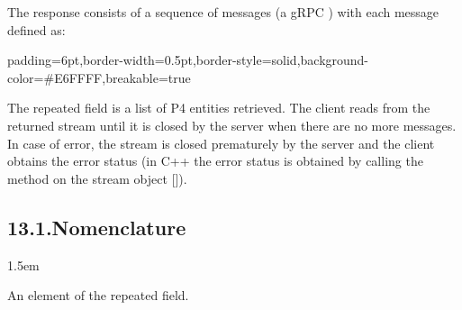 \documentclass[11pt]{article}
\begin{document}
{%
The response consists of a sequence of messages (a gRPC ) with
each message defined as:%

\begin{mdbmargintb}{6pt}{6pt}%
\begin{mdblock}{padding=6pt,border-width=0.5pt,border-style=solid,background-color=\#E6FFFF,breakable=true}%
\begin{mdpre}%
\end{mdpre}%
\end{mdblock}%
\end{mdbmargintb}%

\noindent{}The  repeated field is a list of P4 entities retrieved. The client
reads from the returned stream until it is closed by the server when there are
no more messages. In case of error, the stream is closed prematurely by the
server and the client obtains the error status (in C++ the error status is
obtained by calling the  method on the stream object
[]).%

\subsection{13.1.\hspace*{0.5em}Nomenclature}\label{sec-nomenclature}%

\begin{mddefinitions}%


\begin{mdbmarginx}{}{}{}{1.5em}%
\begin{mddefdata}%
An element of the  repeated field.
\end{mddefdata}%
\end{mdbmarginx}%


\end{mddefinitions}}
\end{document}
